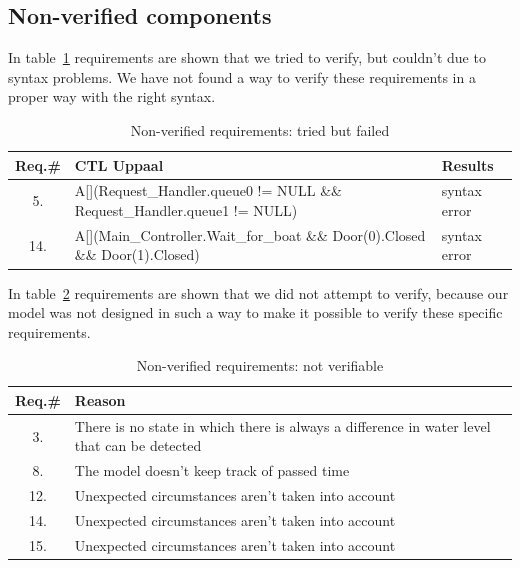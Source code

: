 \documentclass{article}
\begin{document}
      \newpage  
      
    \subsection{Non-verified components}\label{subsec:nonver_comp}
    In table~\ref{tab:nonver_failed} requirements are shown that we tried to verify, but couldn't due to syntax problems. We have not found a way to verify these requirements in a proper way with the right syntax. 
    
     \begin{table}[h]
            \centering
            \begin{tabular}{|c|p{8cm}|p{2cm}|}
                \hline
              \textbf{Req.\#}  & \textbf{CTL Uppaal} &\textbf{Results}\\
              \hline
              5. & A[](Request\_Handler.queue0 != NULL \&\& Request\_Handler.queue1  != NULL) & syntax error \\
              \hline
              14. & A[](Main\_Controller.Wait\_for\_boat \&\& Door(0).Closed \&\& Door(1).Closed) & syntax error \\
              \hline
              \end{tabular}
            \caption{Non-verified requirements: tried but failed}
            \label{tab:nonver_failed}
        \end{table} 

    In table~\ref{tab:nonver_notver} requirements are shown that we did not attempt to verify, because our model was not designed in such a way to make it possible to verify these specific requirements. 
        \begin{table}[h]
            \centering
            \begin{tabular}{|c|p{8cm}|}
                \hline
              \textbf{Req.\#}  & \textbf{Reason} \\
              \hline
              3. &  There is no state in which there is always a difference in water level that can be detected \\
              \hline
              8. &  The model doesn't keep track of passed time \\
              \hline
              12. & Unexpected circumstances aren't taken into account\\
              \hline 
              14. & Unexpected circumstances aren't taken into account\\
              \hline 
              15. & Unexpected circumstances aren't taken into account\\
              \hline
              \end{tabular}
            \caption{Non-verified requirements: not verifiable}
            \label{tab:nonver_notver}
        \end{table}
\end{document}
